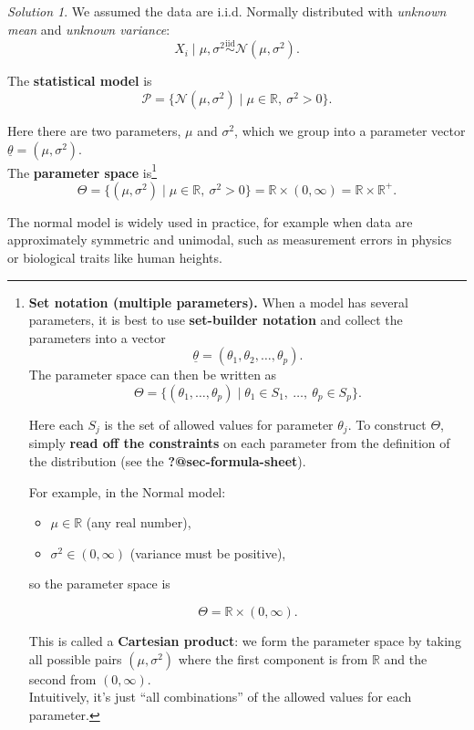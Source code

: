 \documentclass[
  letterpaper,
  DIV=11,
  numbers=noendperiod]{scrreprt}
\providecommand{\tightlist}{%
  \setlength{\itemsep}{0pt}\setlength{\parskip}{0pt}}
\theoremstyle{definition}
\theoremstyle{plain}
\theoremstyle{definition}
\theoremstyle{remark}
\newtheorem{refsolution}{Solution}[chapter]
\begin{document}
\begin{refsolution}
We assumed the data are i.i.d. Normally distributed with \emph{unknown
mean} and \emph{unknown variance}: \[
X_i \mid \mu, \sigma^2 \stackrel{\text{iid}}{\sim} \mathcal{N}(\mu, \sigma^2).
\]

The \textbf{statistical model} is \[
\mathcal{P} = \{ \mathcal{N}(\mu,\sigma^2) \mid \mu \in \mathbb{R},\ \sigma^2 > 0 \}.
\]

Here there are two parameters, \(\mu\) and \(\sigma^2\), which we group
into a parameter vector \(\underline{\theta} = (\mu, \sigma^2)\).\\
The \textbf{parameter space} is\footnote{\textbf{Set notation (multiple
  parameters).} When a model has several parameters, it is best to use
  \textbf{set-builder notation} and collect the parameters into a vector
  \[
      \underline{\theta} = (\theta_1, \theta_2, \ldots, \theta_p).
    \] The parameter space can then be written as \[
      \Theta = \{(\theta_1,\ldots,\theta_p) \mid \theta_1 \in S_1,\ \ldots,\ \theta_p \in S_p\}.
    \]

  Here each \(S_j\) is the set of allowed values for parameter
  \(\theta_j\). To construct \(\Theta\), simply \textbf{read off the
  constraints} on each parameter from the definition of the distribution
  (see the {\textbf{?@sec-formula-sheet}}).

  For example, in the Normal model:

  \begin{itemize}
  \tightlist
  \item
    \(\mu \in \mathbb{R}\) (any real number),\\
  \item
    \(\sigma^2 \in (0,\infty)\) (variance must be positive),
  \end{itemize}

  so the parameter space is

  \[
      \Theta = \mathbb{R} \times (0,\infty).
    \]

  This is called a \textbf{Cartesian product}: we form the parameter
  space by taking all possible pairs \((\mu, \sigma^2)\) where the first
  component is from \(\mathbb{R}\) and the second from \((0,\infty)\).\\
  Intuitively, it's just ``all combinations'' of the allowed values for
  each parameter.}\\
\[
\Theta = \{ (\mu, \sigma^2) \mid \mu \in \mathbb{R},\ \sigma^2 > 0 \} 
       = \mathbb{R} \times (0,\infty) 
       = \mathbb{R} \times \mathbb{R}^+.
\]

The normal model is widely used in practice, for example when data are
approximately symmetric and unimodal, such as measurement errors in
physics or biological traits like human heights.

\label{sol-normal-model}

\end{refsolution}
\end{document}
